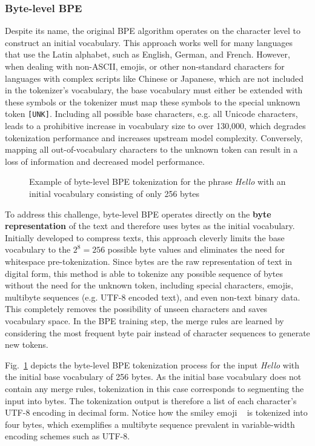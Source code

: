 \subsubsection{Byte-level BPE} \label{subsec:bbpe} 
Despite its name, the original BPE algorithm operates on the character level to
construct an initial vocabulary. This approach works well for many languages
that use the Latin alphabet, such as English, German, and French. However, when
dealing with non-ASCII, emojis, or other non-standard characters for languages
with complex scripts like Chinese or Japanese, which are not included in the
tokenizer's vocabulary, the base vocabulary must either be extended with these
symbols or the tokenizer must map these symbols to the special unknown token
\texttt{[UNK]}. Including all possible base characters, e.g. all Unicode
characters, leads to a prohibitive increase in vocabulary size to over 130,000,
which degrades tokenization performance and increases upstream model complexity.
Conversely, mapping all out-of-vocabulary characters to the unknown token can
result in a loss of information and decreased model performance.

\begin{figure}[htb]
    \centering
    
    \caption[Example of byte-level BPE tokenization]{Example of byte-level BPE
    tokenization for the phrase \textit{Hello \faSmile} with an initial
    vocabulary consisting of only 256 bytes}
    \label{fig:byte_bpe}
\end{figure}

To address this challenge, byte-level BPE operates directly on the \textbf{byte
representation} of the text and therefore uses bytes as the initial vocabulary.
Initially developed to compress texts, this approach cleverly limits the base
vocabulary to the $2^8 = 256$ possible byte values and eliminates the need for
whitespace pre-tokenization. Since bytes are the raw representation of text in
digital form, this method is able to tokenize any possible sequence of bytes
without the need for the unknown token, including special characters, emojis,
multibyte sequences (e.g. UTF-8 encoded text), and even non-text binary data.
This completely removes the possibility of unseen characters and saves
vocabulary space. In the BPE training step, the merge rules are learned by
considering the most frequent byte pair instead of character sequences to
generate new tokens. 

Fig.~\ref{fig:byte_bpe} depicts the byte-level BPE tokenization process for the
input \textit{Hello \faSmile} with the initial base vocabulary of 256 bytes. As
the initial base vocabulary does not contain any merge rules, tokenization in
this case corresponds to segmenting the input into bytes. The tokenization
output is therefore a list of each character's UTF-8 encoding in decimal form.
Notice how the smiley emoji \faSmile~ is tokenized into four bytes, which
exemplifies a multibyte sequence prevalent in variable-width encoding schemes
such as UTF-8.

